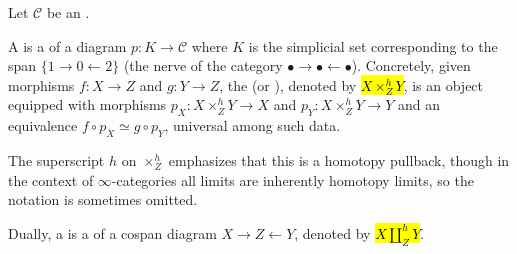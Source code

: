 \begin{definition} \label{definition:pullback_and_pushforward_of_maps_to_and_from_objects_in_an_infty_category}
    Let $\mathcal{C}$ be an .

    A  is a  of a diagram $p : K \to \mathcal{C}$ where $K$ is the simplicial set corresponding to the span $\{1 \to 0 \leftarrow 2\}$ (the nerve of the category $\bullet \to \bullet \leftarrow \bullet$). Concretely, given morphisms $f : X \to Z$ and $g : Y \to Z$, the  (or ), denoted by \hl{$X \times_Z^h Y$}, is an object equipped with morphisms $p_X : X \times_Z^h Y \to X$ and $p_Y : X \times_Z^h Y \to Y$ and an equivalence $f \circ p_X \simeq g \circ p_Y$, universal among such data.

    The superscript $h$ on $\times_Z^h$ emphasizes that this is a homotopy pullback, though in the context of $\infty$-categories all limits are inherently homotopy limits, so the notation is sometimes omitted.

    Dually, a  is a  of a cospan diagram $X \to Z \leftarrow Y$, denoted by \hl{$X \amalg_Z^h Y$}.
\end{definition}
